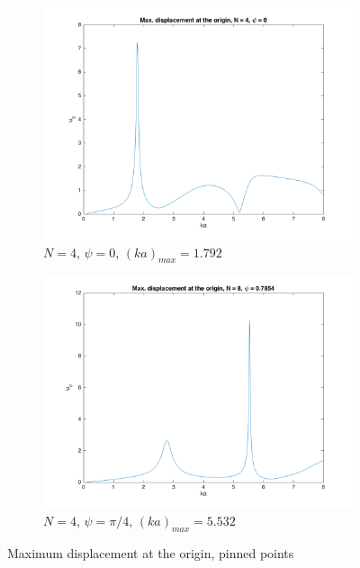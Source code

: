 \documentclass[11pt]{report}
\numberwithin{equation}{section}
\begin{document}
\begin{figure} [H]

    \begin{subfigure}{0.5\textwidth}
    \centering
    \includegraphics[width = 0.7 \linewidth]{Max_disp4}
    \caption{$N=4$, $\psi = 0$, $(ka)_{max} = 1.792$}
    \label{fig:my_label}
    \end{subfigure}
    \begin{subfigure}{0.5\textwidth}
    \centering
    \includegraphics[width = 0.7 \linewidth]{Max_disp8}
    \caption{$N=4$, $\psi = \pi/4$, $(ka)_{max} = 5.532$}
    \label{fig:my_label}
    \end{subfigure}
    
    \caption{Maximum displacement at the origin, pinned points}
\end{figure}
\end{document}

